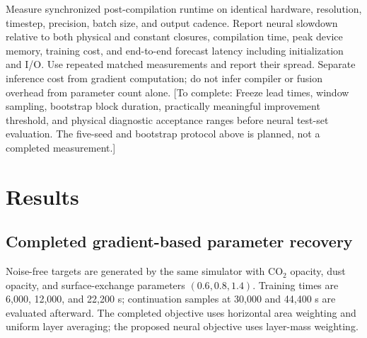 \documentclass{article}
\newcommand{\pending}[1]{\textcolor{blue!65!black}{[To complete: #1]}}
\begin{document}
Measure synchronized post-compilation runtime on identical hardware,
resolution, timestep, precision, batch size, and output cadence. Report neural
slowdown relative to both physical and constant closures, compilation time,
peak device memory, training cost, and end-to-end forecast latency including
initialization and I/O. Use repeated matched measurements and report their
spread. Separate inference cost from gradient computation; do not infer
compiler or fusion overhead from parameter count alone.
\pending{Freeze lead times, window sampling, bootstrap block duration,
practically meaningful improvement threshold, and physical diagnostic
acceptance ranges before neural test-set evaluation. The five-seed and
bootstrap protocol above is planned, not a completed measurement.}

\section{Results}
\subsection{Completed gradient-based parameter recovery}
Noise-free targets are generated by the same simulator with CO$_2$ opacity,
dust opacity, and surface-exchange parameters \((0.6,0.8,1.4)\).
Training times are 6,000, 12,000, and 22,200 s; continuation samples at
30,000 and 44,400 s are evaluated afterward.
The completed objective uses horizontal area weighting and uniform layer
averaging; the proposed neural objective uses layer-mass weighting.
\end{document}
